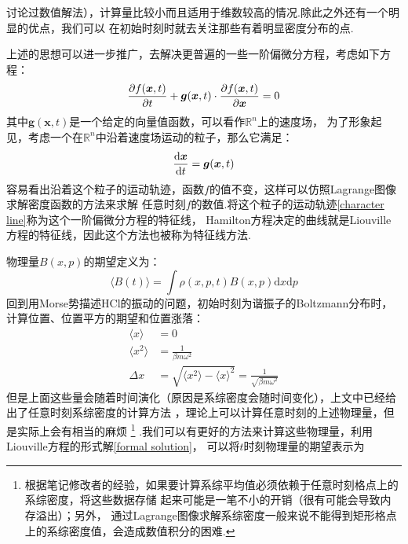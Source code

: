     讨论过数值解法），计算量比较小而且适用于维数较高的情况.除此之外还有一个明显的优点，我们可以
    在初始时刻时就去关注那些有着明显密度分布的点.
    \par 
    上述的思想可以进一步推广，去解决更普遍的一些一阶偏微分方程，考虑如下方程：
    \begin{equation}
        \frac{\partial{f(\bm{x}, t)}}{\partial{t}} + \bm{g}(\bm{x}, t) \cdot \frac{\partial{f(\bm{x}, t)}}{\partial{\bm{x}}} = 0
    \end{equation}
    其中$\bm{g}(\bm{x}, t)$是一个给定的向量值函数，可以看作$\mathbb{R}^n$上的速度场，
    为了形象起见，考虑一个在$\mathbb{R}^n$中沿着速度场运动的粒子，那么它满足：
    \begin{equation}
        \frac{\mathrm{d}{\bm{x}}}{\mathrm{d}{t}} = \bm{g}(\bm{x}, t)
        \label{character line}
    \end{equation}
    容易看出沿着这个粒子的运动轨迹，函数$f$的值不变，这样可以仿照Lagrange图像求解密度函数的方法来求解
    任意时刻$f$的数值.将这个粒子的运动轨迹\ref{character line}称为这个一阶偏微分方程的特征线，
    Hamilton方程决定的曲线就是Liouville方程的特征线，因此这个方法也被称为特征线方法.
    \par
    物理量$B(x, p)$的期望定义为：
    \begin{equation}
        \langle B(t) \rangle = \int \rho(x,p,t) B(x,p) \mathrm{d}x\mathrm{d}p
    \end{equation}
    回到用Morse势描述HCl的振动的问题，初始时刻为谐振子的Boltzmann分布时，计算位置、位置平方的期望和位置涨落：
    \begin{equation}
        \begin{split}
            \langle x \rangle &= 0\\
            \langle x^2 \rangle &= \frac 1{\beta m \omega^2}\\
            \Delta x &= \sqrt{\langle x^2 \rangle - \langle x \rangle ^2} = \frac 1{\sqrt{\beta m \omega^2}}
        \end{split}
    \end{equation}
    但是上面这些量会随着时间演化（原因是系综密度会随时间变化），上文中已经给出了任意时刻系综密度的计算方法
    ，理论上可以计算任意时刻的上述物理量，但是实际上会有相当的麻烦
    \footnote{
        根据笔记修改者的经验，如果要计算系综平均值必须依赖于任意时刻格点上的系综密度，将这些数据存储
        起来可能是一笔不小的开销（很有可能会导致内存溢出）；另外，
        通过Lagrange图像求解系综密度一般来说不能得到矩形格点上的系综密度值，会造成数值积分的困难.
    }
    .我们可以有更好的方法来计算这些物理量，利用Liouville方程的形式解\ref{formal solution}，
    可以将$t$时刻物理量的期望表示为
